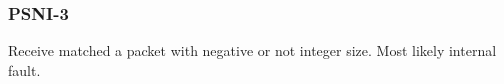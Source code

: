 \subsubsection{PSNI-3}\label{sec:error_code_psni_3}

Receive matched a packet with negative or not integer size. Most likely internal fault.

